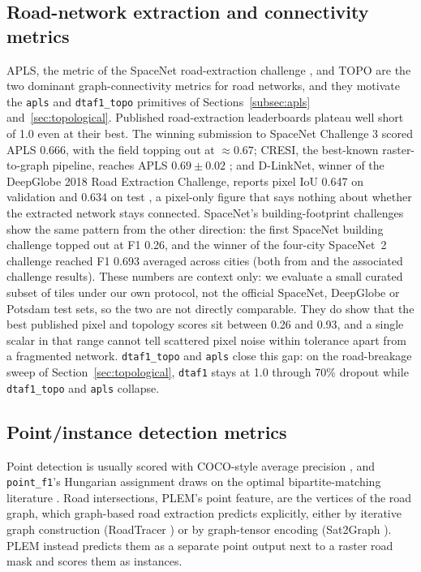 \subsection{Road-network extraction and connectivity metrics}
\label{subsec:related-roads}
APLS, the metric of the SpaceNet road-extraction challenge \cite{vanetten2018spacenet}, and TOPO
\cite{biagioni2012topo} are the two dominant graph-connectivity metrics for road networks, and they
motivate the \texttt{apls} and \texttt{dtaf1\_topo} primitives of Sections~\ref{subsec:apls}
and~\ref{sec:topological}. Published road-extraction leaderboards plateau well short of 1.0 even at
their best. The winning submission to SpaceNet Challenge 3 scored APLS 0.666, with the field
topping out at ${\approx}0.67$; CRESI, the best-known raster-to-graph pipeline, reaches APLS
$0.69 \pm 0.02$ \cite{vanetten2019cresi}; and D-LinkNet, winner of the DeepGlobe 2018 Road
Extraction Challenge, reports pixel IoU 0.647 on validation and 0.634 on test
\cite{zhou2018dlinknet}, a pixel-only figure that says nothing about whether the extracted network
stays connected. SpaceNet's building-footprint challenges show the same pattern from the other
direction: the first SpaceNet building challenge topped out at F1 0.26, and the winner of the
four-city SpaceNet~2 challenge reached F1 0.693 averaged across cities (both from
\cite{vanetten2018spacenet} and the associated challenge results). These numbers are context only:
we evaluate a small curated subset of tiles under our own protocol, not the official SpaceNet,
DeepGlobe or Potsdam test sets, so the two are not directly comparable. They do show that the best
published pixel and topology scores sit between 0.26 and 0.93, and a single scalar in that range
cannot tell scattered pixel noise within tolerance apart from a fragmented network.
\texttt{dtaf1\_topo} and \texttt{apls} close this gap: on the road-breakage sweep of
Section~\ref{sec:topological}, \texttt{dtaf1} stays at 1.0 through 70\% dropout while
\texttt{dtaf1\_topo} and \texttt{apls} collapse.

\subsection{Point/instance detection metrics}
Point detection is usually scored with COCO-style average precision \cite{lin2014coco}, and
\texttt{point\_f1}'s Hungarian assignment draws on the optimal bipartite-matching literature
\cite{kuhn1955hungarian}. Road intersections, PLEM's point feature, are the vertices of the road
graph, which graph-based road extraction predicts explicitly, either by iterative graph
construction (RoadTracer \cite{bastani2018roadtracer}) or by graph-tensor encoding (Sat2Graph
\cite{he2020sat2graph}). PLEM instead predicts them as a separate point output next to a raster road
mask and scores them as instances.

